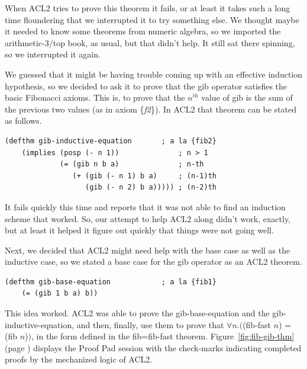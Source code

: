 When ACL2 tries to prove this theorem it fails,
or at least it takes such a long time floundering that we interrupted it
to try something else.
We thought maybe it needed to know some theorems from numeric
algebra, so we imported the arithmetic-3/top book, as usual,
but that didn't help. It still sat there spinning,
so we interrupted it again.

We guessed that it might be having trouble coming up with an effective
induction hypothesis, so we decided to ask it to prove that
the gib operator satisfies the basic Fibonacci axioms.
This is, to prove that the $n^{th}$ value of gib is
the sum of the previous two values (as in axiom \{\emph{f2}\}).
In ACL2 that theorem can be stated as follows.
\begin{samepage}
\begin{center}
\begin{Verbatim}
(defthm gib-inductive-equation       ; a la {fib2}
    (implies (posp (- n 1))              ; n > 1
             (= (gib n b a)              ; n-th
                (+ (gib (- n 1) b a)     ; (n-1)th
                   (gib (- n 2) b a))))) ; (n-2)th
\end{Verbatim}
\end{center}
\end{samepage}

It fails quickly this time and reports that it was not able
to find an induction scheme that worked.
So, our attempt to help ACL2 along didn't work, exactly,
but at least it helped it figure out quickly that
things were not going well.

Next, we decided that ACL2 might need help with the
base case as well as the inductive case, so we
stated a base case for the gib operator as an ACL2 theorem.

\begin{samepage}
\begin{center}
\begin{Verbatim}
(defthm gib-base-equation            ; a la {fib1}
    (= (gib 1 b a) b))
\end{Verbatim}
\end{center}
\end{samepage}

This idea worked. ACL2 was able to prove the gib-base-equation
and the gib-inductive-equation, and then, finally,
use them to prove that $\forall n.($(fib-fast $n$) = (fib $n$)$)$,
in the form defined in the fib=fib-fast theorem.
Figure~\ref{fig:fib-gib-thm} (page \pageref{fig:fib-gib-thm})
displays the Proof Pad session with the check-marks
indicating completed proofs by the mechanized logic of ACL2.


